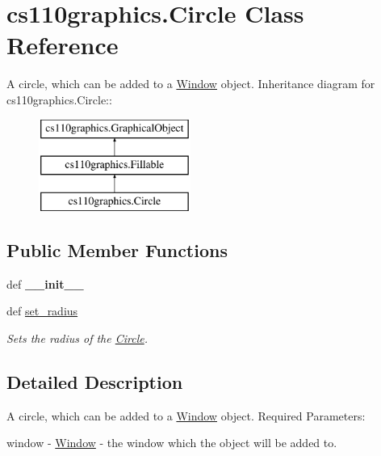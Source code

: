 \hypertarget{classcs110graphics_1_1Circle}{
\section{cs110graphics.Circle Class Reference}
\label{classcs110graphics_1_1Circle}
}


A circle, which can be added to a \hyperlink{classcs110graphics_1_1Window}{Window} object.  
Inheritance diagram for cs110graphics.Circle::\begin{figure}[H]
\begin{center}
\leavevmode
\includegraphics[height=3cm]{classcs110graphics_1_1Circle}
\end{center}
\end{figure}
\subsection*{Public Member Functions}
\begin{DoxyCompactItemize}
\item 
\hypertarget{classcs110graphics_1_1Circle_a7c92c173c0e9666d0682c48fbd170e9f}{
def {\bfseries \_\-\_\-init\_\-\_\-}}
\label{classcs110graphics_1_1Circle_a7c92c173c0e9666d0682c48fbd170e9f}

\item 
def \hyperlink{classcs110graphics_1_1Circle_a39b0cb138b31565d2a52180a2b03cc31}{set\_\-radius}
\begin{DoxyCompactList}\small\item\em Sets the radius of the \hyperlink{classcs110graphics_1_1Circle}{Circle}. \item\end{DoxyCompactList}\end{DoxyCompactItemize}


\subsection{Detailed Description}
A circle, which can be added to a \hyperlink{classcs110graphics_1_1Window}{Window} object. Required Parameters:
\begin{DoxyItemize}
\item window -\/ \hyperlink{classcs110graphics_1_1Window}{Window} -\/ the window which the object will be added to.
\end{DoxyItemize}

